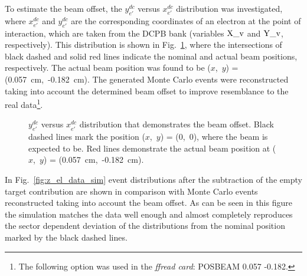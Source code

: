 To estimate the beam offset, the $y_{e'}^{dc}$ versus $x_{e'}^{dc}$ distribution was investigated, where $x_{e'}^{dc}$ and $y_{e'}^{dc}$ are the corresponding coordinates of an electron at the point of interaction, which are taken from the DCPB bank (variables $\rm X\_v$ and $\rm Y\_v$, respectively). This distribution is shown in Fig.~\ref{fig:beam_offset}, where the intersections of black dashed and solid red lines indicate the nominal and actual beam positions, respectively. The actual beam position was found to be ($x$,~$y$) = (0.057~cm,~-0.182~cm). The generated Monte Carlo events were reconstructed taking into account the determined beam offset to improve resemblance to the real data\footnote[6]{The following option was used in the {\em ffread card}: POSBEAM 0.057 -0.182.}.

\begin{figure}[!ht]
\begin{center}
\end{center}
\caption{\small $y_{e'}^{dc}$ versus $x_{e'}^{dc}$ distribution that demonstrates the beam offset. Black dashed lines mark the position ($x$,~$y$) = (0,~0), where the beam is expected to be. Red lines demonstrate the actual beam position at ($x$,~$y$) = (0.057~cm,~-0.182~cm). }
\label{fig:beam_offset}
\end{figure}


In Fig.~\ref{fig:z_el_data_sim} event distributions after the subtraction of the empty target contribution are shown in comparison with Monte Carlo events reconstructed taking into account the beam offset. As can be seen in this figure the simulation matches the data well enough and almost completely reproduces the sector dependent deviation of the distributions from the nominal position marked by the black dashed lines.

